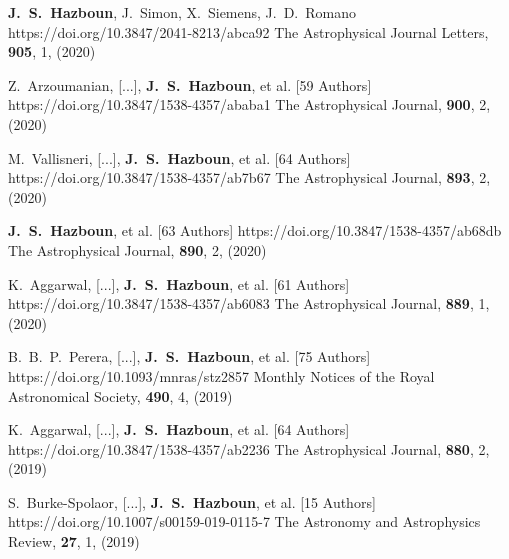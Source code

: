          {\textbf{J.~S.~Hazboun}, J.~{Simon}, X.~{Siemens}, J.~D.~{Romano}}
         {https://doi.org/10.3847/2041-8213/abca92}
         {{The Astrophysical Journal Letters}, \textbf{905}, 1, (2020)}

         {Z.~{Arzoumanian}, [...], \textbf{J.~S.~{Hazboun}}, et al. [59 Authors]}
         {https://doi.org/10.3847/1538-4357/ababa1}
         {{The Astrophysical Journal}, \textbf{900}, 2, (2020)}

         {M.~{Vallisneri}, [...], \textbf{J.~S.~{Hazboun}}, et al. [64 Authors]}
         {https://doi.org/10.3847/1538-4357/ab7b67}
         {{The Astrophysical Journal}, \textbf{893}, 2, (2020)}

         {\textbf{J.~S.~{Hazboun}}, et al. [63 Authors]}
         {https://doi.org/10.3847/1538-4357/ab68db}
         {{The Astrophysical Journal}, \textbf{890}, 2, (2020)}

         {K.~{Aggarwal}, [...], \textbf{J.~S.~{Hazboun}}, et al. [61 Authors]}
         {https://doi.org/10.3847/1538-4357/ab6083}
         {{The Astrophysical Journal}, \textbf{889}, 1, (2020)}

         {B.~B.~P.~{Perera}, [...], \textbf{J.~S.~{Hazboun}}, et al. [75 Authors]}
         {https://doi.org/10.1093/mnras/stz2857}
         {{Monthly Notices of the Royal Astronomical Society}, \textbf{490}, 4, (2019)}

         {K.~{Aggarwal}, [...], \textbf{J.~S.~{Hazboun}}, et al. [64 Authors]}
         {https://doi.org/10.3847/1538-4357/ab2236}
         {{The Astrophysical Journal}, \textbf{880}, 2, (2019)}

         {S.~{Burke-Spolaor}, [...], \textbf{J.~S.~{Hazboun}}, et al. [15 Authors]}
         {https://doi.org/10.1007/s00159-019-0115-7}
         {{The Astronomy and Astrophysics Review}, \textbf{27}, 1, (2019)}

